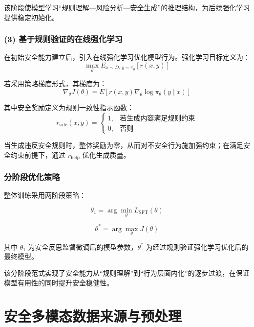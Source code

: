 该阶段使模型学习“规则理解—风险分析—安全生成”的推理结构，为后续强化学习提供稳定初始化。

\subsubsection*{(3) 基于规则验证的在线强化学习}

在初始安全能力建立后，引入在线强化学习优化模型行为。强化学习目标定义为：
\begin{equation}
\max_\theta 
E_{x \sim D, \, y \sim \pi_\theta}
\left[
r(x,y)
\right]
\end{equation}

若采用策略梯度形式，其梯度为：
\begin{equation}
\nabla_\theta J(\theta)
=
E
\left[
r(x,y)
\nabla_\theta \log \pi_\theta(y \mid x)
\right]
\end{equation}

其中安全奖励定义为规则一致性指示函数：
\begin{equation}
r_{\mathrm{safe}}(x,y)
=
\begin{cases}
1, & \text{若生成内容满足规则约束} \\
0, & \text{否则}
\end{cases}
\end{equation}

当生成违反安全规则时，整体奖励为零，从而对不安全行为施加强约束；在满足安全约束前提下，通过 $r_{\mathrm{help}}$ 优化生成质量。

\subsubsection*{分阶段优化策略}

整体训练采用两阶段策略：

\begin{equation}
\theta_1
=
\arg\min_\theta
L_{\mathrm{SFT}}(\theta)
\end{equation}

\begin{equation}
\theta^*
=
\arg\max_\theta
J(\theta)
\end{equation}



其中 $\theta_1$ 为安全反思监督微调后的模型参数，$\theta^*$ 为经过规则验证强化学习优化后的最终模型。

该分阶段范式实现了安全能力从“规则理解”到“行为层面内化”的逐步过渡，在保证模型有用性的同时提升安全稳健性。

\section{安全多模态数据来源与预处理}

